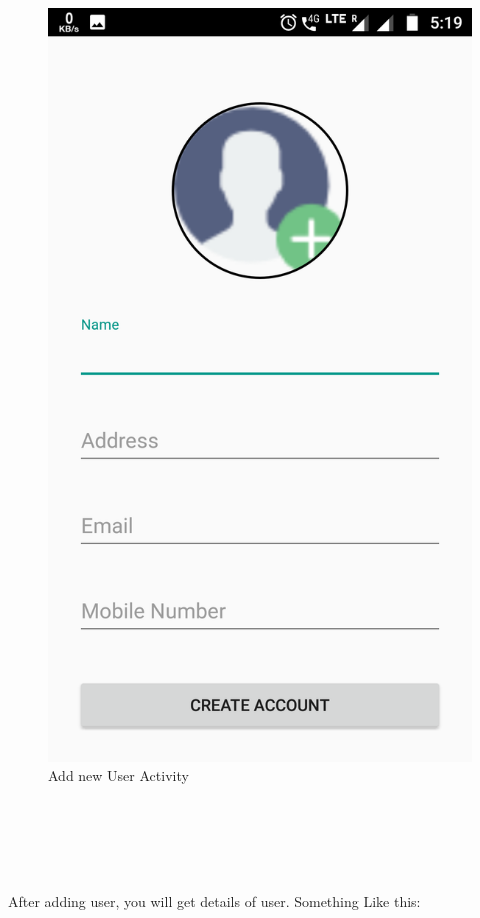 \begin{figure}[h]
	\centering
	\includegraphics[width=0.7\linewidth]{s07}
	\caption{Add new User Activity}
\end{figure}
\begin{text}
	\\
	\\
	\\
	\\
\end{text}
After adding user, you will get details of user. Something Like this:
